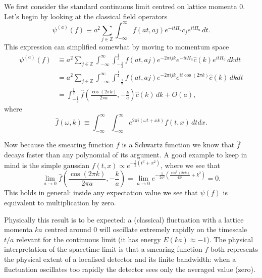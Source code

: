 \documentclass[prl,twocolumn,lengthcheck,superscriptaddress]{revtex4-1}
\theoremstyle{definition}
\theoremstyle{remark}
\begin{document}
We first consider the standard continuous limit centred on lattice momenta $0$. Let's begin by looking at the classical field operators 
\begin{equation}
	\psi^{(a)}(f) \equiv a^2\sum_{j\in\mathbb{Z}} \int_{-\infty}^\infty f(at, aj) e^{-itH_a}c_j e^{itH_a} \, dt.
\end{equation}
This expression can simplified somewhat by moving to momentum space
\begin{equation}
	\begin{split}
		\psi^{(a)}(f) &\equiv a^2\sum_{j\in\mathbb{Z}} \int_{-\infty}^\infty \int_{-\frac12}^{\frac12} f(at, aj) e^{-2\pi i jk} e^{-itH_a}\widehat{c}(k) e^{itH_a} \, dkdt \\
		&= a^2\sum_{j\in\mathbb{Z}} \int_{-\infty}^\infty \int_{-\frac12}^{\frac12} f(at, aj) e^{-2\pi i jk} e^{it \cos(2\pi k)} \widehat{c}(k)  \, dkdt \\
		&= \int_{-\frac12}^{\frac12}\widehat{f}\left(\frac{\cos(2\pi k)}{2\pi a}, -\frac{k}{a}\right) \widehat{c}(k)\, dk + O(a),
	\end{split}
\end{equation}
where
\begin{equation}
	\widehat{f}(\omega,k) \equiv \int_{-\infty}^{\infty} \int_{-\infty}^{\infty} e^{2\pi i (\omega t + xk)}f(t,x)\, dtdx.
\end{equation}

Now because the smearing function $f$ is a Schwartz function we know that $\widehat{f}$ decays faster than any polynomial of its argument. A good example to keep in mind is the simple gaussian $f(t,x) \propto e^{-\frac12(t^2+x^2)}$, where we see that
\begin{equation}
		\lim_{a\rightarrow 0} \widehat{f}\left(\frac{\cos(2\pi k)}{2\pi a}, -\frac{k}{a}\right)  = \lim_{a\rightarrow 0} e^{-\frac{1}{2a^2}( \frac{\cos^2(2\pi k)}{4\pi^2} + k^2)} 
			= 0.
\end{equation}
This holds in general: inside any expectation value we see that $\psi(f)$ is equivalent to multiplication by zero. 

Physically this result is to be expected: a (classical) fluctuation with a lattice momenta $ka$ centred around $0$ will oscillate extremely rapidly on the timescale $t/a$ relevant for the continuous limit (it has energy $E(ka) \approx -1$). The physical interpretation of the spacetime limit is that a smearing function $f$ both represents the physical extent of a localised detector and its finite bandwidth: when a fluctuation oscillates too rapidly the detector sees only the averaged value (zero). 
\end{document}
